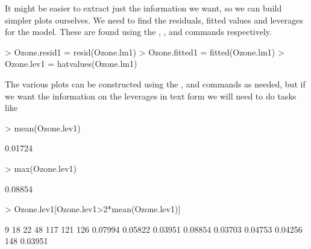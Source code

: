  
It might be easier to extract just the information we want, so we can build simpler plots ourselves. We need to find the residuals, fitted values and leverages for the model. These are found using the , , and  commands respectively. 

\begin{Schunk}
\begin{Sinput}
> Ozone.resid1 = resid(Ozone.lm1) 
> Ozone.fitted1 = fitted(Ozone.lm1) 
> Ozone.lev1 = hatvalues(Ozone.lm1) 
\end{Sinput}
\end{Schunk}

The various plots can be constructed using the , and  commands as needed, but if we want the information on the leverages in text form we will need to do tasks like 

\begin{Schunk}
\begin{Sinput}
> mean(Ozone.lev1) 
\end{Sinput}
\begin{Soutput}
[1] 0.01724
\end{Soutput}
\begin{Sinput}
> max(Ozone.lev1) 
\end{Sinput}
\begin{Soutput}
[1] 0.08854
\end{Soutput}
\begin{Sinput}
> Ozone.lev1[Ozone.lev1>2*mean(Ozone.lev1)] 
\end{Sinput}
\begin{Soutput}
      9      18      22      48     117     121     126 
0.07994 0.05822 0.03951 0.08854 0.03703 0.04753 0.04256 
    148 
0.03951 
\end{Soutput}
\end{Schunk}

